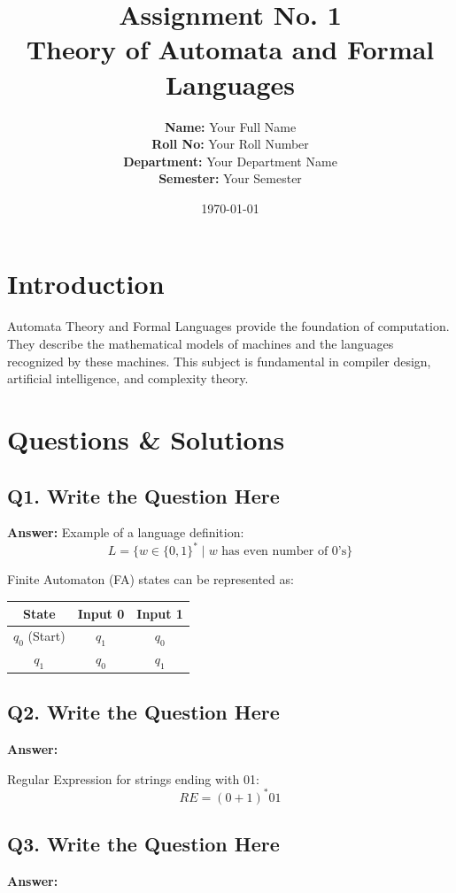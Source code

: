 \documentclass[12pt,a4paper]{article}
\title{\textbf{Assignment No. 1}\\
\large Theory of Automata and Formal Languages}
\author{
\textbf{Name:} Your Full Name \\
\textbf{Roll No:} Your Roll Number \\
\textbf{Department:} Your Department Name \\
\textbf{Semester:} Your Semester
}
\date{\today}
\begin{document}
\maketitle
\thispagestyle{empty}
\newpage

\tableofcontents
\newpage

\section{Introduction}
Automata Theory and Formal Languages provide the foundation of computation. 
They describe the mathematical models of machines and the languages recognized by these machines. 
This subject is fundamental in compiler design, artificial intelligence, and complexity theory.

\section{Questions \& Solutions}

\subsection*{Q1. Write the Question Here}
\textbf{Answer:}  
Example of a language definition:  
\[
L = \{ w \in \{0,1\}^* \mid w \text{ has even number of 0's} \}
\]

Finite Automaton (FA) states can be represented as:  

\begin{center}
\begin{tabular}{|c|c|c|}
\hline
State & Input 0 & Input 1 \\
\hline
$q_0$ (Start) & $q_1$ & $q_0$ \\
$q_1$ & $q_0$ & $q_1$ \\
\hline
\end{tabular}
\end{center}

\subsection*{Q2. Write the Question Here}
\textbf{Answer:}  

Regular Expression for strings ending with 01:
\[
RE = (0+1)^*01
\]

\subsection*{Q3. Write the Question Here}
\textbf{Answer:}  
\end{document}
